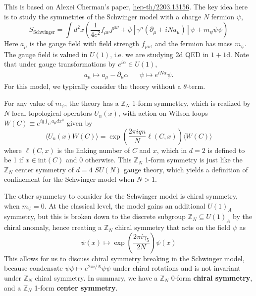 This is based on Alexei Cherman's paper, \href{https://arxiv.org/pdf/2203.13156.pdf}{hep-th/2203.13156}. The key idea here is to study the symmetries of the Schwinger model with a charge $N$ fermion $\psi$,
\begin{equation}
	S_{\mathrm{Schwinger}} = \int d^2 x \left( \frac{1}{4e^2} f_{\mu\nu}f^{\mu\nu} + \overline\psi [\gamma^\mu (\partial_\mu + iN a_\mu)] \psi  + m_\psi \overline\psi \psi \right)
\end{equation}
Here $a_\mu$ is the gauge field with field strength $f_{\mu\nu}$, and the fermion has mass $m_\psi$. The gauge field is valued in $U(1)$, i.e. we are studying 2d QED in $1+1$d. Note that under gauge transformations by $e^{i\alpha}\in U(1)$,
\begin{align}
	a_\mu\mapsto a_\mu - \partial_\mu \alpha && \psi\mapsto e^{i N \alpha} \psi.
\end{align}
For this model, we typically consider the theory without a $\theta$-term. 

For any value of $m_\psi$, the theory has a $\mathbb Z_N$ 1-form symmettry, which is realized by $N$ local topological operators $U_n(x)$, with action on Wilson loops $W(C)\equiv e^{iq \int_C a_\mu dx^\mu}$ given by
\begin{equation}
	\langle U_n(x) W(C)\rangle = \exp\left( \frac{2\pi i q n}{N} \ell(C, x)\right) \langle W(C)\rangle
\end{equation}
where $\ell(C, x)$ is the linking number of $C$ and $x$, which in $d = 2$ is defined to be 1 if $x\in\mathrm{int}(C)$ and $0$ otherwise. This $\mathbb Z_N$ 1-form symmetry is just like the $\mathbb Z_N$ center symmetry of $d = 4$ $SU(N)$ gauge theory, which yields a definition of confinement for the Schwinger model when $N > 1$. 

The other symmetry to consider for the Schwinger model is chiral symmetry, when $m_\psi = 0$. At the classical level, the model gains an additional $U(1)_A$ symmetry, but this is broken down to the discrete subgroup $\mathbb Z_N\subseteq U(1)_A$ by the chiral anomaly, hence creating a $\mathbb Z_N$ chiral symmetry that acts on the field $\psi$ as
\begin{equation}
	\psi(x) \mapsto \exp\left( \frac{2\pi i \gamma_5}{2N} \right) \psi(x)
\end{equation}
This allows for us to discuss chiral symmetry breaking in the Schwinger model, because condensate $\overline\psi\psi\mapsto e^{2\pi i / N} \overline\psi\psi$ under chiral rotations and is not invariant under $\mathbb Z_N$ chiral symmetry. In summary, we have a $\mathbb Z_N$ 0-form \textbf{chiral symmetry}, and a $\mathbb Z_N$ 1-form \textbf{center symmetry}. 

